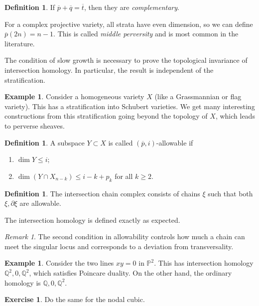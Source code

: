 \documentclass[leqno, openany]{memoir}
\theoremstyle{definition}
\newtheorem{defn}[thm]{Definition}
\newtheorem{exm}[thm]{Example}
\newtheorem{exer}[thm]{Exercise}
\theoremstyle{remark}
\newtheorem{rmk}[thm]{Remark}
\theoremstyle{plain}
\theoremstyle{definition}
\theoremstyle{remark}
\newcommand{\Q}{\mathbb{Q}}
\renewcommand{\P}{\mathbb{P}}
\begin{document}
\begin{defn}
    If $\overline{p} + \overline{q} = \overline{t}$, then they are \textit{complementary}.
\end{defn}

For a complex projective variety, all strata have even dimension, so we can define $\overline{p}(2n) = n-1$. This is called \textit{middle perversity} and is most common in the literature.

The condition of slow growth is necessary to prove the topological invariance of intersection homology. In particular, the result is independent of the stratification.

\begin{exm}
    Consider a homogeneous variety $X$ (like a Grassmannian or flag variety). This has a stratification into Schubert varieties. We get many interesting constructions from this stratification going beyond the topology of $X$, which leads to perverse sheaves.
\end{exm}

\begin{defn}
    A subspace $Y \subset X$ is called $(\overline{p}, i)$-allowable if
    \begin{enumerate}
        \item $\dim Y \leq i$;
        \item $\dim (Y \cap X_{n-k}) \leq i - k + p_k$ for all $k \geq 2$.
    \end{enumerate}
\end{defn}

\begin{defn}
    The intersection chain complex consists of chains $\xi$ such that both $\xi, \partial \xi$ are allowable.
\end{defn}

The intersection homology is defined exactly as expected.

\begin{rmk}
    The second condition in allowability controls how much a chain can meet the singular locus and corresponds to a deviation from transversality.
\end{rmk}

\begin{exm}
    Consider the two lines $xy = 0$ in $\P^2$. This has intersection homology $\Q^2, 0, \Q^2$, which satisfies Poincare duality. On the other hand, the ordinary homology is $\Q, 0, \Q^2$.
\end{exm}

\begin{exer}
    Do the same for the nodal cubic.
\end{exer}
\end{document}
